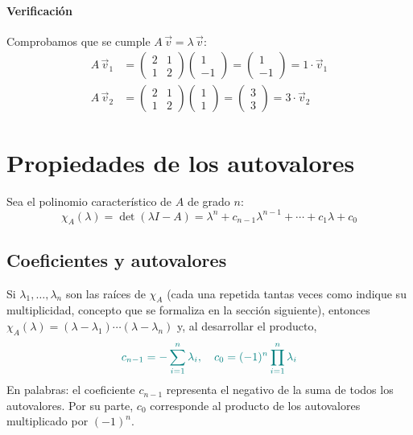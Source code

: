\documentclass{article}
\newcommand{\vect}[1]{\vec{#1}}
\begin{document}
\paragraph*{Verificación}
Comprobamos que se cumple \(A\,\vect{v}=\lambda\,\vect{v}\):
\[
\begin{aligned}
A\,\vect{v}_1&=\begin{pmatrix}2&1\\1&2\end{pmatrix}\begin{pmatrix}1\\-1\end{pmatrix}=\begin{pmatrix}1\\-1\end{pmatrix}=1\cdot \vect{v}_1\\[6pt]
A\,\vect{v}_2&=\begin{pmatrix}2&1\\1&2\end{pmatrix}\begin{pmatrix}1\\1\end{pmatrix}=\begin{pmatrix}3\\3\end{pmatrix}=3\cdot \vect{v}_2
\end{aligned}
\]

\section*{Propiedades de los autovalores}

Sea el polinomio característico de \(A\) de grado \(n\):
\[
\chi_A(\lambda)=\det(\lambda I-A)=\lambda^n + c_{n-1}\lambda^{n-1}+\cdots + c_1\lambda + c_0
\]

\subsection*{Coeficientes y autovalores}
Si \(\lambda_1,\dots,\lambda_n\) son las raíces de \(\chi_A\) (cada una repetida tantas veces como indique su multiplicidad, concepto que se formaliza en la sección siguiente), entonces \(\chi_A(\lambda)=(\lambda-\lambda_1)\cdots(\lambda-\lambda_n)\) y, al desarrollar el producto,
\[\color{teal}
c_{n-1} = -\sum_{i=1}^n \lambda_i,
\quad
c_0 = (-1)^n\prod_{i=1}^n \lambda_i
\]
En palabras: el coeficiente \(c_{n-1}\) representa el negativo de la suma de todos los autovalores. Por su parte, \(c_0\) corresponde al producto de los autovalores multiplicado por \((-1)^n\).
\end{document}
